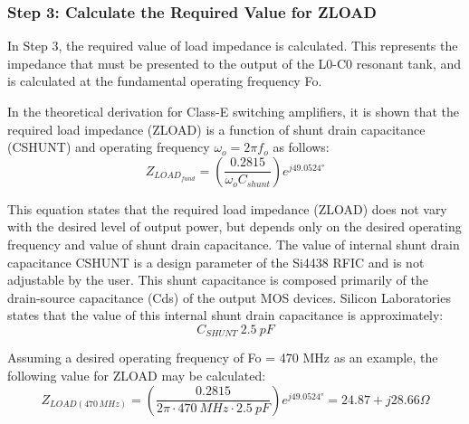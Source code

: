       \subsubsection{Step 3: Calculate the Required Value for ZLOAD}
        In Step 3, the required value of load impedance is calculated. This represents the impedance that 
        must be presented to the output of the L0-C0 resonant tank, and is calculated at the fundamental 
        operating frequency Fo.
        
        In the theoretical derivation for Class-E switching amplifiers, it is shown that the required load 
        impedance (ZLOAD) is a function of shunt drain capacitance (CSHUNT) and operating frequency 
        \(\omega_o = 2\pi f_o\) as follows:
        \begin{equation}\label{EXP001:eq_spirit02}
          Z_{LOAD_{fund}} = \left(\frac{0.2815}{\omega_oC_{shunt}}\right)e^{j49.0524°}
        \end{equation}
        
        This equation states that the required load impedance (ZLOAD) does not vary with the desired level 
        of output power, but depends only on the desired operating frequency and value of shunt drain 
        capacitance. The value of internal shunt drain capacitance CSHUNT is a design parameter of the 
        Si4438 RFIC and is not adjustable by the user. This shunt capacitance is composed primarily of the 
        drain-source capacitance (Cds) of the output MOS devices. Silicon Laboratories states that the 
        value of this internal shunt drain capacitance is approximately:          
        \begin{equation}\label{EXP001:eq_spirit03}
          C_{SHUNT} ~ \SI{2.5}{pF}
        \end{equation}          
        
        Assuming a desired operating frequency of Fo = 470 MHz as an example, the following value for ZLOAD 
        may be calculated:
        \begin{equation}\label{EXP001:eq_spirit04}
          Z_{LOAD(470\,MHz)} = 
            \left(\frac{0.2815}{2\pi\cdot\SI{470}{MHz}\cdot\SI{2.5}{pF}}\right)e^{j49.0524°} =
            24.87 + j28.66\Omega
        \end{equation} 
        
